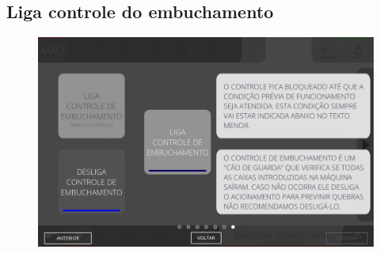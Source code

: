 \subsection{Liga controle do embuchamento}
\begin{figure}
    \centering
    \includegraphics[width=576 px,height=360 px]{src/imagesICV/02-machine/8.png}
\end{figure}

